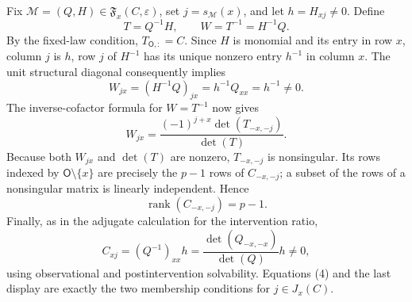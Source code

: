 Fix \(\mathcal M=(Q,H)\in\mathfrak F_x(C,\varepsilon)\), set \(j=s_{\mathcal M}(x)\), and let \(h=H_{xj}\ne0\). Define
\[
 T=Q^{-1}H,\qquad W=T^{-1}=H^{-1}Q.
\]
By the fixed-law condition, \(T_{\mathsf O,:}=C\). Since \(H\) is monomial and its entry in row \(x\), column \(j\) is \(h\), row \(j\) of \(H^{-1}\) has its unique nonzero entry \(h^{-1}\) in column \(x\). The unit structural diagonal consequently implies
\[
 W_{jx}=(H^{-1}Q)_{jx}=h^{-1}Q_{xx}=h^{-1}\ne0. \tag{3}
\]
The inverse-cofactor formula for \(W=T^{-1}\) now gives
\[
 W_{jx}=\frac{(-1)^{j+x}\det(T_{-x,-j})}{\det(T)}.
\]
Because both \(W_{jx}\) and \(\det(T)\) are nonzero, \(T_{-x,-j}\) is nonsingular. Its rows indexed by \(\mathsf O\setminus\{x\}\) are precisely the \(p-1\) rows of \(C_{-x,-j}\); a subset of the rows of a nonsingular matrix is linearly independent. Hence
\[
 \operatorname{rank}(C_{-x,-j})=p-1. \tag{4}
\]
Finally, as in the adjugate calculation for the intervention ratio,
\[
 C_{xj}=(Q^{-1})_{xx}h
 =\frac{\det(Q_{-x,-x})}{\det(Q)}h\ne0,
\]
using observational and postintervention solvability. Equations (4) and the last display are exactly the two membership conditions for \(j\in J_x(C)\).